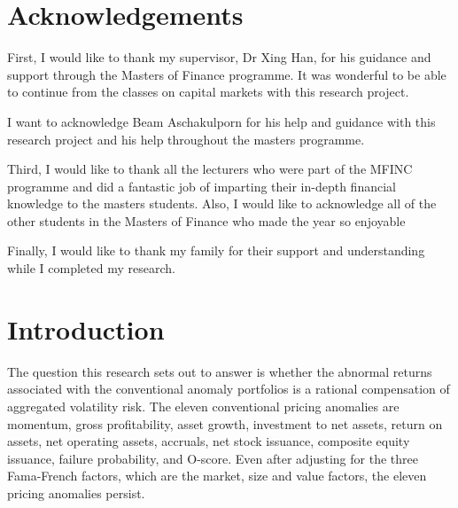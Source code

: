\documentclass[12pt, a4paper, oneside]{article}
\begin{document}
\thispagestyle{plain}
\section*{\centering Acknowledgements}
First, I would like to thank my supervisor, Dr Xing Han, for his guidance and support through the Masters of Finance programme. It was wonderful to be able to continue from the classes on capital markets with this research project.

I want to acknowledge Beam Aschakulporn for his help and guidance with this research project and his help throughout the masters programme.

Third, I would like to thank all the lecturers who were part of the MFINC programme and did a fantastic job of imparting their in-depth financial knowledge to the masters students. Also, I would like to acknowledge all of the other students in the Masters of Finance who made the year so enjoyable

Finally, I would like to thank my family for their support and understanding while I completed my research. 


\raggedbottom
\pagebreak

\onehalfspacing
\thispagestyle{plain}
\renewcommand{\contentsname}{Table of Contents}
\tableofcontents
\raggedbottom
\pagebreak
\thispagestyle{plain}
\listoftables
\raggedbottom
\pagebreak
{}
\pagestyle{fancy}
\doublespacing
\section{Introduction}\label{sec:Intro}
The question this research sets out to answer is whether the abnormal returns associated with the conventional anomaly portfolios is a rational compensation of aggregated volatility risk. The eleven conventional pricing anomalies are momentum, gross profitability, asset growth, investment to net assets, return on assets, net operating assets, accruals, net stock issuance, composite equity issuance, failure probability, and O-score. Even after adjusting for the three Fama-French factors, which are the market, size and value factors, the eleven pricing anomalies persist. 
\end{document}
